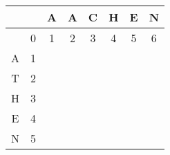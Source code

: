 \documentclass[12pt, a4paper]{article}
\begin{document}
\section{} %

\section{} %

\begin{tabular}{|c|c|c|c|c|c|c|c|}
	\hline
	&& A & A & C & H & E & N\\\hline
	& 0 & 1 & 2 & 3 & 4 & 5 & 6\\\hline
	A & 1 &&&&&&\\\hline
	T & 2 &&&&&&\\\hline
	H & 3 &&&&&&\\\hline
	E & 4 &&&&&&\\\hline
	N & 5 &&&&&&\\\hline
\end{tabular}
\end{document}

